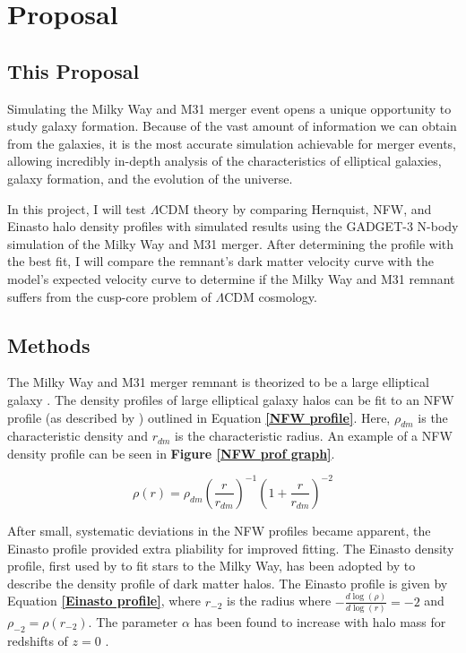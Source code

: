 \section{Proposal}

\subsection{This Proposal}
Simulating the Milky Way and M31 merger event opens a unique opportunity to study galaxy formation. Because of the vast amount of information we can obtain from the galaxies, it is the most accurate simulation achievable for merger events, allowing incredibly in-depth analysis of the characteristics of elliptical galaxies, galaxy formation, and the evolution of the universe. 

In this project, I will test $\Lambda$CDM theory by comparing Hernquist, NFW, and Einasto halo density profiles with simulated results using the GADGET-3 N-body simulation of the Milky Way and M31 merger. After determining the profile with the best fit, I will compare the remnant's dark matter velocity curve with the model's expected velocity curve to determine if the Milky Way and M31 remnant suffers from the cusp-core problem of $\Lambda$CDM cosmology.

\subsection{Methods}
The Milky Way and M31 merger remnant is theorized to be a large elliptical galaxy \cite{vanderMarel2012}. The density profiles of large elliptical galaxy halos can be fit to an NFW profile (as described by \cite{Navarro1997}) outlined in Equation \textbf{\ref{NFW profile}}. Here, $\rho_{dm}$ is the characteristic density and $r_{dm}$ is the characteristic radius. An example of a NFW density profile can be seen in \textbf{Figure \ref{NFW prof graph}}.

\smallskip
\begin{equation}
    \rho(r) = \rho_{dm} \left( \frac{r}{r_{dm}} \right)^{-1} \left(1 + \frac{r}{r_{dm}} \right)^{-2} 
    \label{NFW profile}
\end{equation}
\smallskip

After small, systematic deviations in the NFW profiles became apparent, the Einasto profile provided extra pliability for improved fitting. The Einasto density profile, first used by \cite{Einasto1965} to fit stars to the Milky Way, has been adopted by \cite{Navarroetal2004} to describe the density profile of dark matter halos. The Einasto profile is given by Equation \textbf{\ref{Einasto profile}}, where $r_{-2}$ is the radius where $ -\frac{d\log(\rho)}{d\log(r)}=-2$ and $\rho_{-2} = \rho(r_{-2})$. The parameter $\alpha$ has been found to increase with halo mass for redshifts of $z=0$ \cite{Frenk2012}.

